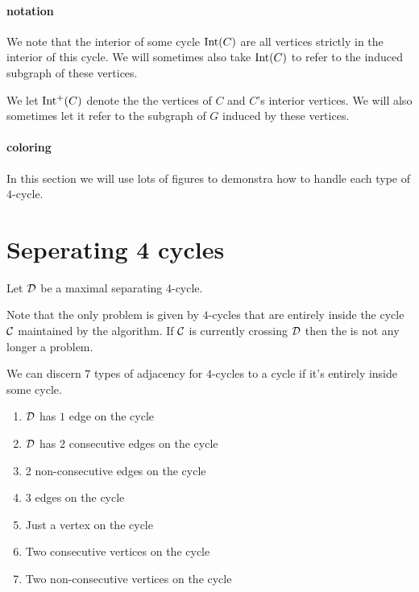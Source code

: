 
\newcommand{\D}{\scr D}

\paragraph{notation}

We note that the interior of some cycle $\operatorname{Int}(C)$ are all vertices strictly in the interior of this cycle. We will sometimes also take $\operatorname{Int}(C)$ to refer to the induced subgraph of these vertices.

We let $\operatorname{Int^{+}}(C)$ denote the the vertices of $C$ and $C$'s interior vertices. We will also sometimes let it refer to the subgraph of $G$ induced by these vertices.


\paragraph{coloring}
In this section we will use lots of figures to demonstra how to handle each type of $4$-cycle.


\section{Seperating 4 cycles}
Let $\D$ be a maximal separating $4$-cycle.

Note that the only problem is given by $4$-cycles that are entirely inside the cycle $\mathcal{C}$ maintained by the algorithm. If $\mathcal{C}$ is currently crossing $\D$ then the is not any longer a problem.

We can discern $7$ types of adjacency for $4$-cycles to a cycle if it's entirely inside some cycle.
\begin{enumerate}
  \renewcommand*{\labelenumi}{(\alph{enumi})}%
  \renewcommand*{\theenumi}{(\alph{enumi})}%

  \item $\D$ has $1$ edge on the cycle
  \label{t:1}
  \item $\D$ has 2 consecutive edges on the cycle
  \label{t:2cons}
  \item 2 non-consecutive edges on the cycle
  \label{t:2alt}
  \item 3 edges on the cycle
  \label{t:3}
  \item Just a vertex on the cycle
  \label{t:v1}
  \item Two consecutive vertices on the cycle
  \label{t:v2cons}
  \item Two non-consecutive vertices on the cycle
  \label{t:v2alt}
\end{enumerate}

